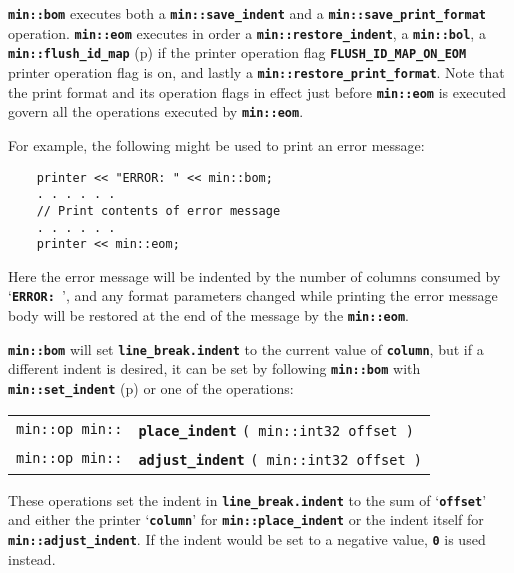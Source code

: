 \documentclass[12pt]{article}
\makeatletter
\newcommand{\TT}[1]{{\tt \bfseries #1}}
\newcommand{\ttindex}[1]{\index{#1@{\tt #1}}}
\newcommand{\pagref}[1]{p\pageref{#1}}
\newcommand{\EOL}{\penalty \exhyphenpenalty}
\newenvironment{indpar}[1][0.3in]%
	{\begin{list}{}%
		     {\setlength{\itemsep}{0in}%
		      \setlength{\topsep}{0in}%
		      \setlength{\parsep}{1ex}%
		      \setlength{\labelwidth}{#1}%
		      \setlength{\leftmargin}{#1}%
		      \addtolength{\leftmargin}{\labelsep}}%
	 \item}%
	{\end{list}}
\newcommand{\LABEL}[1]{\label{#1}}
\newcommand{\MINKEY}[1]%
	   {\TT{#1}\ttindex{min::#1}\ttindex{#1}}
\makeatother
\begin{document}
\TT{min::bom} executes both
a \TT{min::\EOL save\_\EOL indent}
and a \TT{min::\EOL save\_\EOL print\_\EOL format} operation.
\TT{min::\EOL eom} executes in order a
\TT{min::\EOL restore\_\EOL indent},
a \TT{min::\EOL bol},
a \TT{min::\EOL flush\_\EOL id\_\EOL map} (\pagref{MIN::FLUSH_ID_MAP})
if the printer operation flag
\TT{FLUSH\_ID\_MAP\_ON\_EOM} printer operation flag is on, and lastly
a \TT{min::\EOL restore\_\EOL print\_\EOL format}.
Note that the print format and its operation flags
in effect just before \TT{min::\EOL eom}
is executed govern all the operations executed by
\TT{min::\EOL eom}.

For example, the following might be used to print an error message:
\begin{indpar}\begin{verbatim}
    printer << "ERROR: " << min::bom;
    . . . . . .
    // Print contents of error message
    . . . . . .
    printer << min::eom;
\end{verbatim}\end{indpar}

Here the error message will be indented by the number of columns
consumed by `\TT{ERROR:~}', and any format parameters changed
while printing the error message body will be restored at the end
of the message by the \TT{min::\EOL eom}.

\TT{min::bom} will set \TT{line\_\EOL break.indent}
to the current value of \TT{column},
but if a different indent is desired, it can be set by following
\TT{min::\EOL bom} with \TT{min::\EOL set\_\EOL indent}
(\pagref{MIN::SET_INDENT}) or one of the operations:

\begin{indpar}[1em]\begin{tabular}{r@{}l}
\verb|min::op min::|
    & \MINKEY{place\_\EOL indent} \verb|( min::int32 offset )|
\LABEL{MIN::PLACE_INDENT} \\
\verb|min::op min::|
    & \MINKEY{adjust\_\EOL indent} \verb|( min::int32 offset )|
\LABEL{MIN::ADJUST_INDENT} \\
\end{tabular}\end{indpar}

These operations set the indent in \TT{line\_\EOL break.indent}
to the sum of `\TT{offset}' and either
the printer `\TT{column}' for \TT{min::\EOL place\_\EOL indent}
or the indent itself for \TT{min::\EOL adjust\_\EOL indent}.
If the indent would be set to a negative value,
\TT{0} is used instead.
\end{document}
